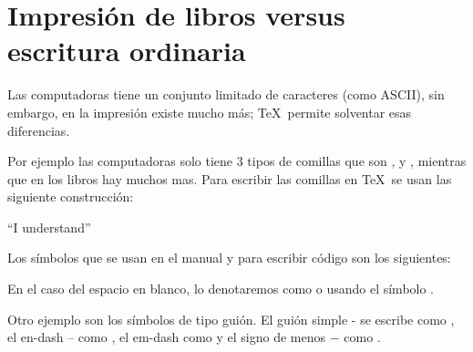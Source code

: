 \section{Impresión de libros versus escritura ordinaria}

Las computadoras tiene un conjunto limitado de caracteres (como
ASCII), sin embargo, en la impresión existe mucho más; \TeX\
permite solventar esas diferencias.

Por ejemplo las computadoras solo tiene 3 tipos de comillas que
son ,  y , mientras que en
los libros hay muchos mas. Para escribir las comillas en \TeX\ se
usan las siguiente construcción:
\begin{texexample}
  ``I understand''
\end{texexample}

Los símbolos que se usan en el manual y para escribir código son
los siguientes:
En el caso del espacio en blanco, lo denotaremos como  o usando el símbolo \textvisiblespace.

Otro ejemplo son los símbolos de tipo guión. El guión simple - se escribe como \codeline{-}, el en-dash -- como \codeline{--}, el em-dash como \codeline{---} y el signo de menos $-$ como \codeline{$-$}.
